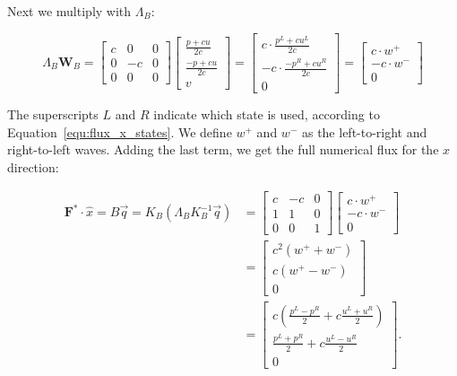 Next we multiply with $\Lambda_B$:

\begin{equation}
	\Lambda_B \mathbf{W}_B =
	\begin{bmatrix}
        c & 0 & 0 \\ 
        0 & -c & 0 \\ 
        0 & 0 & 0
	\end{bmatrix}
	\begin{bmatrix}
        \frac{p + c u}{2 c} \\ 
        \frac{-p + c u}{2 c} \\ 
        v
	\end{bmatrix} = 
	\begin{bmatrix}
        c \cdot \frac{p^L + c u^L}{2 c} \\ 
        -c \cdot \frac{-p^R + c u^R}{2 c} \\ 
        0
	\end{bmatrix} = 
	\begin{bmatrix}
        c \cdot w^+ \\ 
        -c \cdot w^- \\ 
        0
	\end{bmatrix}
\end{equation}

The superscripts $L$ and $R$ indicate which state is used, according to
Equation~\ref{equ:flux_x_states}. We define $w^+$ and $w^-$ as the left-to-right and right-to-left
waves. Adding the last term, we get the full numerical flux for the $x$ direction:

\begin{equation} \label{alg:numerical_flux_x}
	\begin{split}
        \mathbf{F}^* \cdot \widehat{x} = B \overrightarrow{q} = K_B \left( \Lambda_B K_B^{-1} \overrightarrow{q} \right) & = 
        \begin{bmatrix}
            c & -c & 0 \\ 
            1 & 1 & 0 \\ 
            0 & 0  & 1
        \end{bmatrix}
        \begin{bmatrix}
            c \cdot w^+ \\ 
            -c \cdot w^- \\ 
            0
        \end{bmatrix} \\ 
        & = \begin{bmatrix}
            c^2 \left( w^+ + w^- \right) \\ 
            c \left( w^+ - w^- \right) \\ 
            0
        \end{bmatrix} \\
        & = \begin{bmatrix}
            c \left( \frac{p^L - p^R}{2} + c \frac{u^L + u^R}{2} \right) \\ 
            \frac{p^L + p^R}{2} + c \frac{u^L - u^R}{2} \\ 
            0
        \end{bmatrix}.
	\end{split}
\end{equation}

